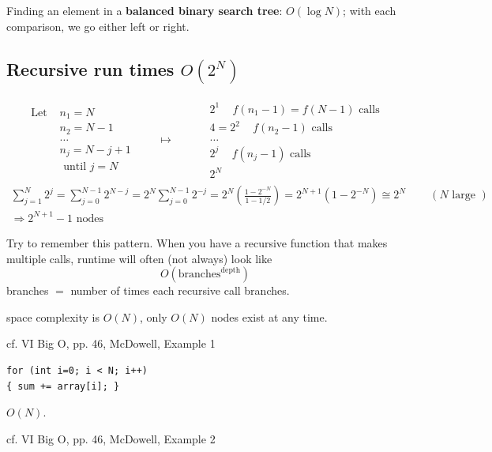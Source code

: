 \documentclass[10pt]{amsart}
\begin{document}
Finding an element in a \textbf{balanced binary search tree}: $O(\log{N})$; with each comparison, we go either left or right.

\subsection{Recursive run times $O(2^N)$}

\[
\begin{gathered}
\begin{aligned}
\text{ Let } & n_1 = N \\
& n_2 = N - 1 \\
& \dots  \\
& n_j = N - j + 1 \\
& \text{ until } j = N 
\end{aligned} \qquad \mapsto \qquad 
\begin{aligned}
& 2^1 \quad \, f(n_1 - 1) = f(N-1) \text{ calls } \\ 
& 4 = 2^2 \quad \, f(n_2- 1) \text{ calls }  \\
& \dots \\
& 2^j \quad \, f(n_j - 1) \text{ calls }  \\
& 2^N 
\end{aligned}
\end{gathered}
\]
\[
\begin{gathered}
\sum_{j=1}^N 2^j = \sum_{j=0}^{N-1} 2^{N-j} = 2^N \sum_{j=0}^{N-1} 2^{-j} = 2^N \left(\frac{ 1 - 2^{-N} }{ 1 - 1/2} \right) = 2^{N+1} (1- 2^{-N}) \cong 2^N \qquad \, (N \text{ large }) \\ 
\Longrightarrow 2^{N+1} -1 \text{ nodes } 
\end{gathered}
\]

Try to remember this pattern. When you have a recursive function that makes multiple calls, runtime will often (not always) look like
\begin{equation}
\boxed{ O(\text{branches}^{\text{depth}}) }
\end{equation}
branches $=$ number of times each recursive call branches.

space complexity is $O(N)$, only $O(N)$ nodes exist at any time.

cf. VI Big O, pp. 46, McDowell, Example 1

\begin{verbatim}
for (int i=0; i < N; i++)
{ sum += array[i]; }
\end{verbatim}
$O(N)$.

cf. VI Big O, pp. 46, McDowell, Example 2
\end{document}
